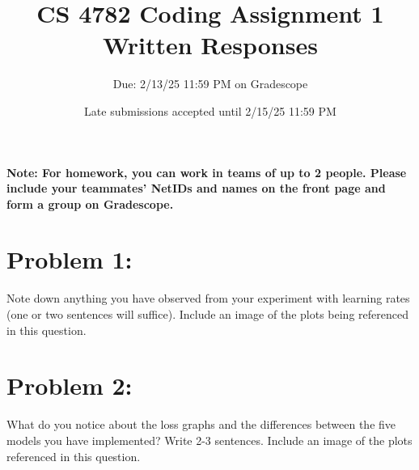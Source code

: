\documentclass{article}
\title{CS 4782 Coding Assignment 1 Written Responses\vspace{-10pt}}
\author{Due: 2/13/25 11:59 PM on Gradescope}
\date{Late submissions accepted until 2/15/25 11:59 PM}
\begin{document}
    \maketitle
    \textbf{Note: For homework, you can work in teams of up to 2 people. Please include your teammates’ NetIDs and names on the front page and form a group on Gradescope. }
\maketitle
\section*{Problem 1:}

Note down anything you have observed from your experiment with learning rates (one or two sentences will suffice). Include an image of the plots being referenced in this question. 


\section*{Problem 2:}


What do you notice about the loss graphs and the differences between the five models you have implemented? Write 2-3 sentences. Include an image of the plots referenced in this question.
\end{document}
